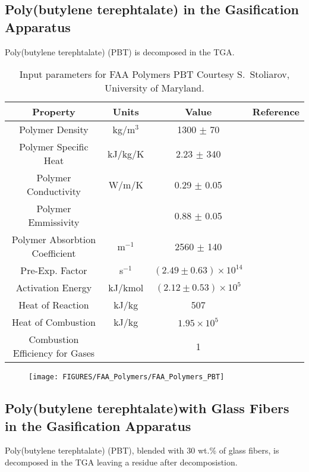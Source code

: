 \newpage

\subsection{Poly(butylene terephtalate) in the Gasification Apparatus}
 Poly(butylene terephtalate) (PBT)  is decomposed in the TGA. 
 
\begin{table}[h!]
\caption[PBT.]{Input parameters for FAA Polymers PBT Courtesy S.~Stoliarov, University of Maryland.}
\begin{tabular}{|c|c|c|c|}
\hline
  Property &      Units &      Value &  Reference \\ \hline \hline
Polymer Density &     kg/m$^3$ &  1300 $\pm$ 70 & \cite{Kempel:1} \\ \hline
Polymer Specific Heat &    kJ/kg/K & 2.23 $\pm$ 340 & \cite{Kempel:1} \\ \hline
Polymer Conductivity &      W/m/K & 0.29 $\pm$ 0.05 & \cite{Kempel:1} \\ \hline
Polymer Emmissivity &            & 0.88 $\pm$ 0.05 & \cite{Linteris:2} \\ \hline
Polymer Absorbtion Coefficient &  m$^{-1}$  & 2560 $\pm$ 140 & \cite{Linteris:2} \\ \hline
Pre-Exp. Factor &       s$^{-1}$ &  $(2.49 \pm 0.63) \times 10^{14}$ & \cite{Kempel:1} \\ \hline
Activation Energy &    kJ/kmol & $(2.12 \pm 0.53) \times 10^{5}$ & \cite{Kempel:1} \\ \hline
Heat of Reaction &      kJ/kg &        507 & \cite{Kempel:1} \\ \hline
Heat of Combustion &      kJ/kg & $1.95 \times 10^{5}$ & \cite{Kempel:1} \\ \hline
Combustion Efficiency for Gases &            &          1 & \cite{Kempel:1} \\ \hline
\end{tabular}  
\end{table}

\begin{figure}[h!]
\texttt{[image: FIGURES/FAA\_Polymers/FAA\_Polymers\_PBT]}
\end{figure}

\newpage

\subsection{Poly(butylene terephtalate)with Glass Fibers in the Gasification Apparatus}
 Poly(butylene terephtalate) (PBT), blended with 30 wt.\% of glass fibers,  is decomposed in the TGA leaving a residue after decomposistion. 
 

